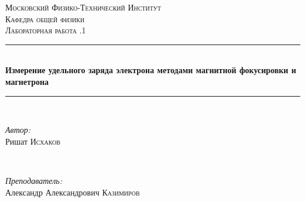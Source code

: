 \documentclass[a4paper, 12pt]{article}
\begin{document}
\begin{titlepage}

\newcommand{\HRule}{\rule{\linewidth}{0.5mm}} %

\center %
 

\textsc{\LARGE Московский Физико-Технический Институт}\\[1,5cm] %
\textsc{\Large Кафедра общей физики}\\[0.5cm] %
\textsc{\large Лабораторная работа .1}\\[0.5cm] %


\HRule
\\[0.4cm]
{ \huge \bfseries Измерение удельного заряда электрона методами магнитной фокусировки и магнетрона}
\\[0.2cm] %
\HRule
\\[1.5cm]


 

\begin{minipage}{0.4\textwidth}
	\begin{flushleft} \large
		\emph{Автор:}\\
		Ришат \textsc{Исхаков} %
	\end{flushleft}
\end{minipage}
~
\begin{minipage}{0.4\textwidth}
	\begin{flushright} \large
		\emph{Преподаватель:} \\
		Александр Александрович \textsc{Казимиров} %
	\end{flushright}
\end{minipage}


\end{titlepage}
\end{document}
